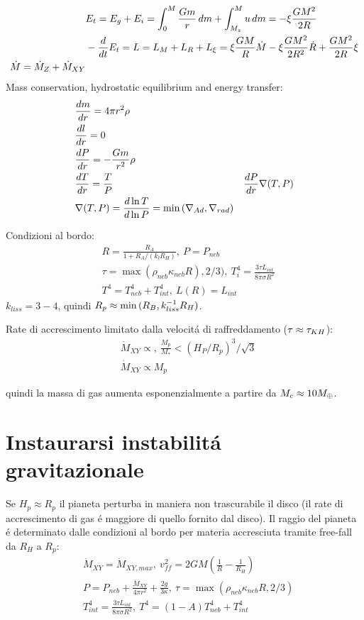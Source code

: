 \begin{workout}
\begin{workout}
\begin{align}
&E_t=E_g+E_i=\int_0^M\frac{Gm}{r}\,dm+\int_{M_z}^Mu\,dm=-\xi\frac{GM^2}{2R}\\
&-\TDof{t}E_t=L=L_M+L_R+L_{\xi}=\xi\frac{GM}{R}\dot{M}-\xi\frac{GM^2}{2R^2}\dot{R}+\frac{GM^2}{2R}\xi\\
\dot{M}=\dot{M}_Z+\dot{M}_{XY}
\end{align}
Mass conservation, hydrostatic equilibrium and energy transfer:
\begin{align}
&\TDy{r}{m}=4\pi r^2\rho\\
&\TDy{r}{l}=0\\
&\TDy{r}{P}=-\frac{Gm}{r^2}\rho\\
&\TDy{r}{T}=\frac{T}{P}&\TDy{r}{P}\nabla(T,P)\\
&\nabla(T,P)=\TDly{P}{T}=\min{(\nad{},\nrad{})}
\end{align}

Condizioni al bordo:
\begin{align}
&R=\frac{R_A}{1+R_A/(k_lR_H )},\ P=P_{neb}\\
&\tau=\max{(\rho_{neb}\kappa_{neb}R),2/3)},\ T_i^4=\frac{3\tau L_{int}}{8\pi\sigma R^2}\\
&T^4=T_{neb}^4+T_{int}^4,\ L(R)=L_{int}
\end{align}
$k_{liss}=3-4$, quindi $R_p\approx \min{(R_B,k_{liss}\expy{-1}R_H)}$.
\end{workout}

Rate di accrescimento limitato dalla velocit\'a di raffreddamento ($\tau\approx\tkh{}$):
\begin{align}
&\dot{M}_{XY}\propto,\ \frac{M_p}{M_*}<(H_P/R_p)^3/\sqrt{3}\\
&\dot{M}_{XY}\propto M_p
\end{align}

quindi la massa di gas aumenta esponenzialmente a partire da $M_c\approx10\mearth{}$.

\section{Instaurarsi instabilit\'a gravitazionale}

Se $H_p\approx R_p$ il pianeta perturba in maniera non trascurabile il disco (il rate di accrescimento di gas \'e maggiore di quello fornito dal disco). Il raggio del pianeta \'e determinato dalle condizioni al bordo per materia accresciuta tramite free-fall da $R_H$ a $R_p$:
\begin{align}
&\dot{M}_{XY}=\dot{M}_{XY,max},\ v_{ff}^2=2GM(\frac{1}{R}-\frac{1}{R_H})\\
&P=P_{neb}+\frac{\dot{M}_{XY}}{4\pi r^2}+\frac{2g}{3\kappa},\ \tau=\max{(\rho_{neb}\kappa_{neb}R,2/3)}\\
&T_{int}^4=\frac{3\tau L_{int}}{8\pi\sigma R^2},\ T^4=(1-A)T_{neb}^4+T_{int}^4
\end{align}



\end{workout}
